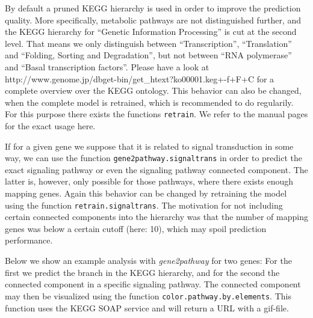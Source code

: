 \documentclass[11pt,a4paper]{article}
\begin{document}
By default a pruned KEGG hierarchy is used in order to improve the prediction quality. More specifically, metabolic pathways are not distinguished further, and the KEGG hierarchy for ``Genetic Information Processing'' is cut at the second level. That means we only distinguish between ``Transcription'', ``Translation'' and ``Folding, Sorting and Degradation'', but not between ``RNA polymerase'' and ``Basal transcription factors''. Please have a look at http://www.genome.jp/dbget-bin/get\_htext?ko00001.keg+-f+F+C for a complete overview over the KEGG ontology. This behavior can also be changed, when the complete model is retrained, which is recommended to do regularily. For this purpose there exists the functions {\tt retrain}. We refer to the manual pages for the exact usage here.

If for a given gene we suppose that it is related to signal transduction in some way, we can use the function {\tt gene2pathway.signaltrans} in order to predict the exact signaling pathway or even the signaling pathway connected component. The latter is, however, only possible for those pathways, where there exists enough mapping genes. Again this behavior can be changed by retraining the model using the function {\tt retrain.signaltrans}. The motivation for not including certain connected components into the hierarchy was that the number of mapping genes was below a certain cutoff (here: 10), which may spoil prediction performance.

Below we show an example analysis with \emph{gene2pathway} for two genes: For the first we predict the branch in the KEGG hierarchy, and for the second the connected component in a specific signaling pathway. The connected component may then be visualized using the function {\tt color.pathway.by.elements}. This function uses the KEGG SOAP service and will return a URL with a gif-file.
\end{document}
